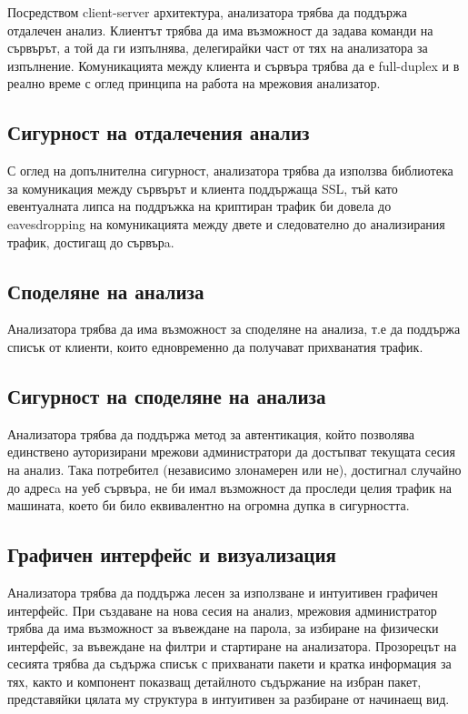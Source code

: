 \documentclass[12pt,a4paper,oneside]{book}
\begin{document}
Посредством client-server архитектура, анализатора трябва да поддържа отдалечен
анализ. Клиентът трябва да има възможност да задава команди на сървърът, а той
да ги изпълнява, делегирайки част от тях на анализатора за изпълнение.
Комуникацията между клиента и сървъра трябва да е full-duplex и в реално време с
оглед принципа на работа на мрежовия анализатор.

\subsection{Сигурност на отдалечения анализ}

С оглед на допълнителна сигурност, анализатора трябва да използва библиотека за
комуникация между сървърът и клиента поддържаща SSL, тъй като евентуалната липса
на поддръжка на криптиран трафик би довела до eavesdropping на комуникацията
между двете и следователно до анализирания трафик, достигащ до сървърa.

\subsection{Споделяне на анализа}

Анализатора трябва да има възможност за споделяне на анализа, т.е да поддържа
списък от клиенти, които едновременно да получават прихванатия трафик. 

\subsection{Сигурност на споделяне на анализа}

Анализатора трябва да поддържа метод за автентикация, който позволява единствено
ауторизирани мрежови администратори да достъпват текущата сесия на
анализ. Така потребител (независимо злонамерен или не), достигнал случайно до
адресa на уеб сървъра, не би имал възможност да проследи целия трафик на
машината, което би било еквивалентно на огромна дупка в сигурността.

\subsection{Графичен интерфейс и визуализация}

Анализатора трябва да поддържа лесен за използване и интуитивен графичен
интерфейс. При създаване на нова сесия на анализ, мрежовия администратор трябва
да има възможност за въвеждане на парола, за избиране на физически интерфейс, за
въвеждане на филтри и стартиране на анализатора. Прозорецът на сесията трябва да
съдържа списък с прихванати пакети и кратка информация за тях, както и
компонент показващ детайлното съдържание на избран пакет, представяйки цялата му
структура в интуитивен за разбиране от начинаещ вид.
\end{document}
